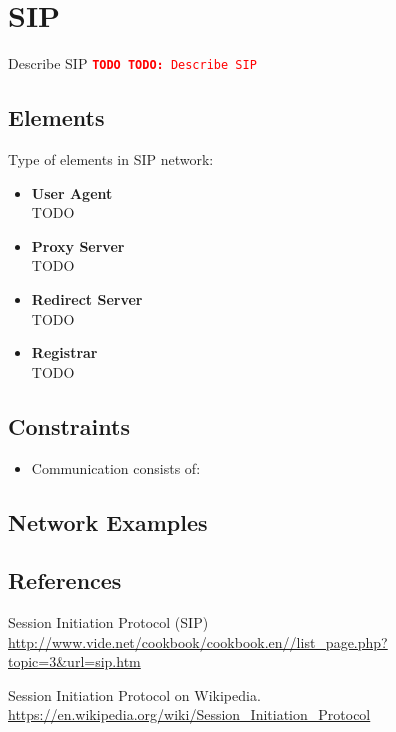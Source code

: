 \documentclass[a4paper]{report}
\newcommand{\TODO}[1]{%
\def\empty{}%
\def\prvniparametr{#1}%
\ifx\prvniparametr\empty%
\begingroup\tt\textcolor{red}{\noindent\textbf{TODO}}\endgroup
\else%
\begingroup\tt\textcolor{red}{\noindent\textbf{TODO:}\ #1}\endgroup
\fi%
}
\begin{document}
\section{SIP}

\TODO{Describe SIP}

\subsection{Elements}

Type of elements in SIP network:

\begin{itemize}
\item \textbf{User Agent} \\
TODO
\item \textbf{Proxy Server} \\
TODO
\item \textbf{Redirect Server} \\
TODO
\item \textbf{Registrar} \\
TODO
\end{itemize}

\subsection{Constraints}

\begin{itemize}

\item Communication consists of:

\end{itemize}

\subsection{Network Examples}

\subsection{References}

\renewcommand{\bibsection}{}
\begin{thebibliography}{1}

Session Initiation Protocol (SIP)
\\ \url{http://www.vide.net/cookbook/cookbook.en//list_page.php?topic=3&url=sip.htm}

Session Initiation Protocol on Wikipedia.
\\ \url{https://en.wikipedia.org/wiki/Session_Initiation_Protocol}

\end{thebibliography}
\end{document}
